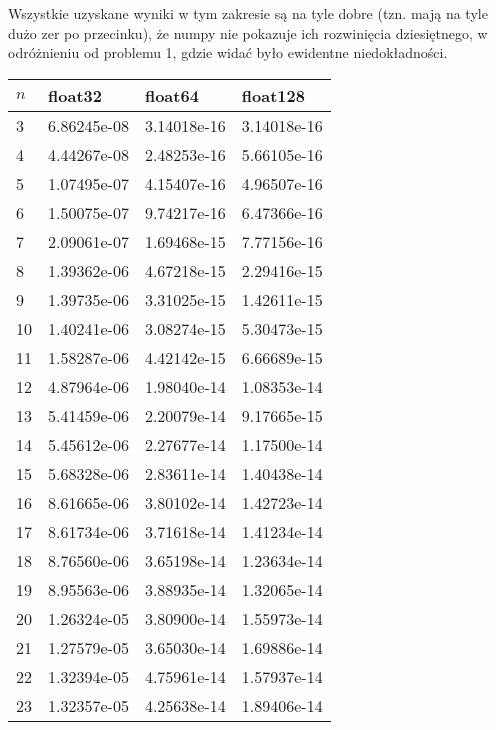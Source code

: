 \documentclass{article}
\begin{document}
Wszystkie uzyskane wyniki w tym zakresie są na tyle dobre (tzn. mają na tyle dużo zer po przecinku),
że numpy nie pokazuje ich rozwinięcia dziesiętnego, w odróżnieniu od problemu 1, gdzie widać było ewidentne
niedokładności.

\newpage
\thispagestyle{empty}

\begin{table}[H]
\parbox{.45\linewidth}{
\hspace*{-2.4cm}
\begin{tabular}{|l|l|l|l|}
\hline
$n$ & float32 & float64 & float128 \\ \hline
3 & 6.86245e-08 & 3.14018e-16 & 3.14018e-16 \\ \hline
4 & 4.44267e-08 & 2.48253e-16 & 5.66105e-16 \\ \hline
5 & 1.07495e-07 & 4.15407e-16 & 4.96507e-16 \\ \hline
6 & 1.50075e-07 & 9.74217e-16 & 6.47366e-16 \\ \hline
7 & 2.09061e-07 & 1.69468e-15 & 7.77156e-16 \\ \hline
8 & 1.39362e-06 & 4.67218e-15 & 2.29416e-15 \\ \hline
9 & 1.39735e-06 & 3.31025e-15 & 1.42611e-15 \\ \hline
10 & 1.40241e-06 & 3.08274e-15 & 5.30473e-15 \\ \hline
11 & 1.58287e-06 & 4.42142e-15 & 6.66689e-15 \\ \hline
12 & 4.87964e-06 & 1.98040e-14 & 1.08353e-14 \\ \hline
13 & 5.41459e-06 & 2.20079e-14 & 9.17665e-15 \\ \hline
14 & 5.45612e-06 & 2.27677e-14 & 1.17500e-14 \\ \hline
15 & 5.68328e-06 & 2.83611e-14 & 1.40438e-14 \\ \hline
16 & 8.61665e-06 & 3.80102e-14 & 1.42723e-14 \\ \hline
17 & 8.61734e-06 & 3.71618e-14 & 1.41234e-14 \\ \hline
18 & 8.76560e-06 & 3.65198e-14 & 1.23634e-14 \\ \hline
19 & 8.95563e-06 & 3.88935e-14 & 1.32065e-14 \\ \hline
20 & 1.26324e-05 & 3.80900e-14 & 1.55973e-14 \\ \hline
21 & 1.27579e-05 & 3.65030e-14 & 1.69886e-14 \\ \hline
22 & 1.32394e-05 & 4.75961e-14 & 1.57937e-14 \\ \hline
23 & 1.32357e-05 & 4.25638e-14 & 1.89406e-14 \\ \hline

\end{tabular}}
\end{table}
\end{document}
